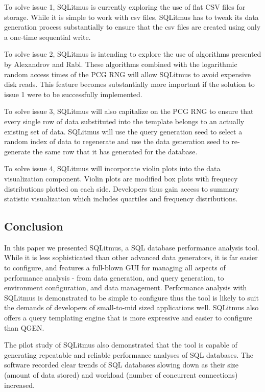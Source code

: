 \documentclass[12pt]{article}
\begin{document}
\begin{spacing}{1.9}
	To solve issue 1, SQLitmus is currently exploring the use of flat CSV files for storage. While it is simple to work with csv files, SQLitmus has to tweak its data generation process substantially to ensure that the csv files are created using only a one-time sequential write.
	
	To solve issue 2, SQLitmus is intending to explore the use of algorithms presented by Alexandrov\cite{Alexandrov:2012} and Rabl\cite{Rabl:2013}. These algorithms combined with the logarithmic random access times of the PCG RNG will allow SQLitmus to avoid expensive disk reads. This feature becomes substantially more important if the solution to issue 1 were to be successfully implemented.
	
	To solve issue 3, SQLitmus will also capitalize on the PCG RNG to ensure that every single row of data substituted into the template belongs to an actually existing set of data. SQLitmus will use the query generation seed to select a random index of data to regenerate and use the data generation seed to re-generate the same row that it has generated for the database.
	
	To solve issue 4, SQLitmus will incorporate violin plots into the data visualization component. Violin plots are modified box plots with frequecy distributions plotted on each side. Developers thus gain access to summary statistic visualization which includes quartiles and frequency distributions.
	
	\subsection{ Conclusion}
	
	In this paper we presented SQLitmus, a SQL database performance analysis tool. While it is less sophisticated than other advanced data generators, it is far easier to configure, and features a full-blown GUI for managing all aspects of performance analysis - from data generation, and query generation, to environment configuration, and data management. Performance analysis with SQLitmus is demonstrated to be simple to configure thus the tool is likely to suit the demands of developers of small-to-mid sized applications well. SQLitmus also offers a query templating engine that is more expressive and easier to configure than QGEN\cite{Poess:2004}.
	
	The pilot study of SQLitmus also demonstrated that the tool is capable of generating repeatable and reliable performance analyses of SQL databases. The software recorded clear trends of SQL databases slowing down as their size (amount of data stored) and workload (number of concurrent connections) increased.
	

\end{spacing}
\end{document}

